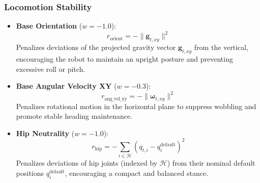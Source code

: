 \subsubsection*{Locomotion Stability}
\begin{itemize}
    \item \textbf{Base Orientation} ($w = -1.0$):
    \begin{equation}
        r_{\text{orient}} = -\|\mathbf{g}_{t,xy}\|^2
    \end{equation}
    Penalizes deviations of the projected gravity vector $\mathbf{g}_{t,xy}$ from the vertical, encouraging the robot to maintain an upright posture and preventing excessive roll or pitch.
    \item \textbf{Base Angular Velocity XY} ($w = -0.3$):
    \begin{equation}
        r_{\text{ang\_vel\_xy}} = -\|\boldsymbol{\omega}_{t,xy}\|^2
    \end{equation}
    Penalizes rotational motion in the horizontal plane to suppress wobbling and promote stable heading maintenance.
    \item \textbf{Hip Neutrality} ($w = -1.0$):
    \begin{equation}
        r_{\text{hip}} = -\sum_{i \in \mathcal{H}} (q_{t,i} - q_i^{\text{default}})^2
    \end{equation}
    Penalizes deviations of hip joints (indexed by $\mathcal{H}$) from their nominal default positions $q_i^{\text{default}}$, encouraging a compact and balanced stance.
\end{itemize}

